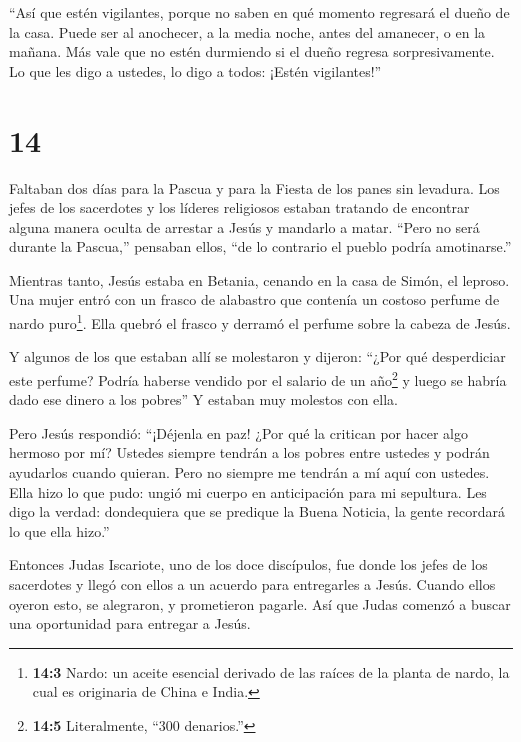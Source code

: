  ``Así que estén vigilantes, porque no saben en qué momento
regresará el dueño de la casa. Puede ser al anochecer, a la media noche,
antes del amanecer, o en la mañana.  Más vale que no estén
durmiendo si el dueño regresa sorpresivamente.  Lo que les
digo a ustedes, lo digo a todos: ¡Estén vigilantes!''

\hypertarget{section-13}{%
\section{14}\label{section-13}}

 Faltaban dos días para la Pascua y para la Fiesta de los
panes sin levadura. Los jefes de los sacerdotes y los líderes religiosos
estaban tratando de encontrar alguna manera oculta de arrestar a Jesús y
mandarlo a matar.  ``Pero no será durante la Pascua,''
pensaban ellos, ``de lo contrario el pueblo podría amotinarse.''

 Mientras tanto, Jesús estaba en Betania, cenando en la casa
de Simón, el leproso. Una mujer entró con un frasco de alabastro que
contenía un costoso perfume de nardo puro\footnote{\textbf{14:3} Nardo:
  un aceite esencial derivado de las raíces de la planta de nardo, la
  cual es originaria de China e India.}. Ella quebró el frasco y derramó
el perfume sobre la cabeza de Jesús.

 Y algunos de los que estaban allí se molestaron y dijeron:
``¿Por qué desperdiciar este perfume?  Podría haberse
vendido por el salario de un año\footnote{\textbf{14:5} Literalmente,
  ``300 denarios.''} y luego se habría dado ese dinero a los pobres'' Y
estaban muy molestos con ella.

 Pero Jesús respondió: ``¡Déjenla en paz! ¿Por qué la
critican por hacer algo hermoso por mí?  Ustedes siempre
tendrán a los pobres entre ustedes y podrán ayudarlos cuando quieran.
Pero no siempre me tendrán a mí aquí con ustedes.  Ella hizo
lo que pudo: ungió mi cuerpo en anticipación para mi sepultura.
 Les digo la verdad: dondequiera que se predique la Buena
Noticia, la gente recordará lo que ella hizo.''

 Entonces Judas Iscariote, uno de los doce discípulos, fue
donde los jefes de los sacerdotes y llegó con ellos a un acuerdo para
entregarles a Jesús.  Cuando ellos oyeron esto, se
alegraron, y prometieron pagarle. Así que Judas comenzó a buscar una
oportunidad para entregar a Jesús.


